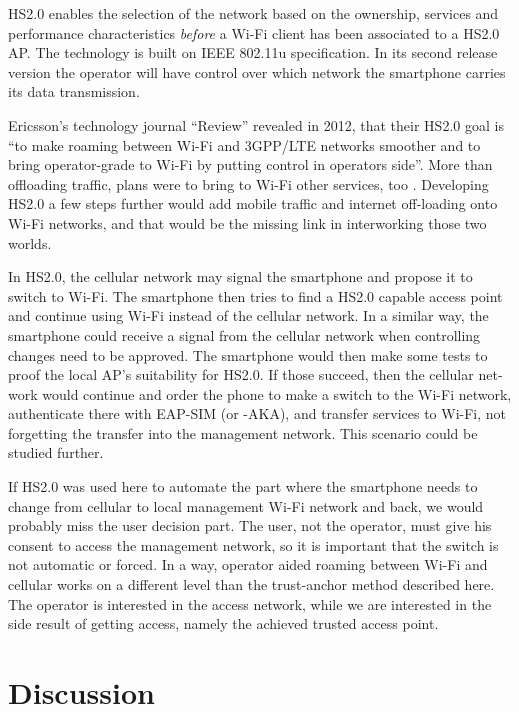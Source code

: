 \documentclass[12pt,a4paper,english]{tutthesis}
\begin{document}
\begin{otherlanguage}{english}
HS2.0
enables the selection of the network based on the ownership, services and
performance characteristics \emph{before} a Wi-Fi client has been associated
to a HS2.0 AP. The technology is built on IEEE 802.11u specification. 
In its second release version the operator will
have control over which network the smartphone carries its data
transmission. 





Ericsson's technology journal ``Review'' revealed in 2012, that their 
HS2.0 goal is ``to make roaming between Wi-Fi and 3GPP/LTE networks smoother
and to bring operator-grade to Wi-Fi by putting control in operators side''. More
than offloading traffic, plans were to bring to Wi-Fi other services, too \cite{er-seamless}.
Developing HS2.0 a few steps further would add mobile traffic and internet
off-loading onto Wi-Fi networks, and that would be the missing link in
interworking those two worlds.



In HS2.0, the cellular network may signal the smartphone and
propose it to switch to Wi-Fi. The smartphone then tries to find a HS2.0 capable
access point and continue using Wi-Fi instead of the cellular network.
In a similar way, the smartphone could receive a signal from the cellular
network when controlling changes need to be approved. The smartphone
would then make some tests to proof the local AP's suitability for 
HS2.0. If those succeed, then the cellular network would continue and order the 
phone to make a switch to the Wi-Fi network, authenticate there with 
EAP-SIM (or -AKA), and transfer services to Wi-Fi, not forgetting 
the transfer into the management network. This scenario could be 
studied further.


If HS2.0 was used here to automate the part where
the smartphone needs to change from cellular to local
management Wi-Fi network and back, we would probably 
miss the user decision part. The user, not the operator,
 must give his consent to access the management network, so
it is important that the switch is not automatic or forced.
In a way, operator aided roaming between Wi-Fi and cellular
works on a different level than the trust-anchor method described here.
The operator is interested in the access network, while
we are interested in the side result of getting access, namely 
the achieved trusted access point.






\section{Discussion}
\label{sec-6-5}


\end{otherlanguage}
\end{document}
